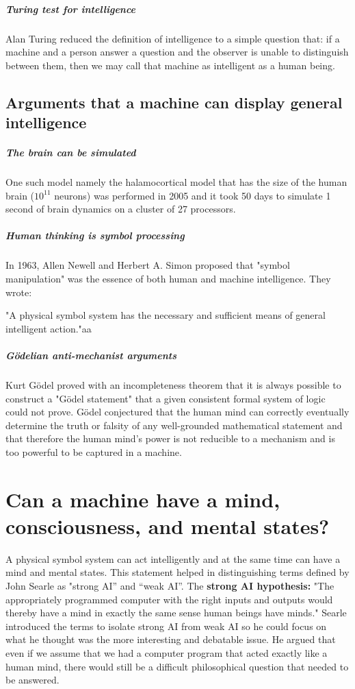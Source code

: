\documentclass[10pt,a4paper,twoside]{article}
\begin{document}
\subparagraph{Turing test for intelligence}
Alan Turing reduced the definition of intelligence to a simple question that: if a machine and a person answer a question and the observer is unable to distinguish between them, then we may call that machine as intelligent as a human being.

\subsection{Arguments that a machine can display general intelligence}
\subparagraph{The brain can be simulated}
One such model namely the halamocortical model that has the size of the human brain (\begin{math} 10^{11} \end{math} neurons) was performed in 2005 and it took 50 days to simulate 1 second of brain dynamics on a cluster of 27 processors.

\subparagraph{Human thinking is symbol processing}
In 1963, Allen Newell and Herbert A. Simon proposed that "symbol manipulation" was the essence of both human and machine intelligence. They wrote:

"A physical symbol system has the necessary and sufficient means of general intelligent action."aa

\subparagraph{Gödelian anti-mechanist arguments}
Kurt Gödel proved with an incompleteness theorem that it is always possible to construct a "Gödel statement" that a given consistent formal system of logic could not prove. Gödel conjectured that the human mind can correctly eventually determine the truth or falsity of any well-grounded mathematical statement and that therefore the human mind's power is not reducible to a mechanism and is too powerful to be captured in a machine.\\

\section{Can a machine have a mind, consciousness, and mental states?}
A physical symbol system can act intelligently and at the same time can have a mind and mental states. This statement helped in distinguishing terms defined by John Searle as "strong AI” and “weak AI”. The \textbf{strong AI hypothesis:} "The appropriately programmed computer with the right inputs and outputs would thereby have a mind in exactly the same sense human beings have minds."
Searle introduced the terms to isolate strong AI from weak AI so he could focus on what he thought was the more interesting and debatable issue. He argued that even if we assume that we had a computer program that acted exactly like a human mind, there would still be a difficult philosophical question that needed to be answered.
\end{document}
